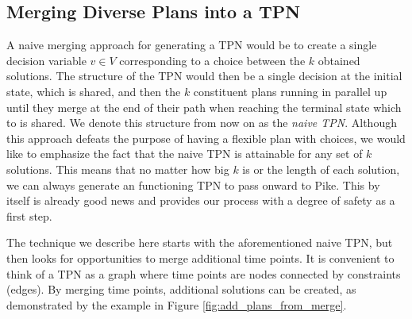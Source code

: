 \subsection{Merging Diverse Plans into a TPN}
\label{generating: merging}
A naive merging approach for generating a TPN would be to create a single decision variable $v \in V$ corresponding to a choice 
between the $k$ obtained solutions. 
The structure of the TPN would then be a single decision at the
initial state, which is shared, and then the $k$ constituent plans running in parallel
up until they merge at the end of their path when reaching the terminal state which to is shared.
We denote this structure from now on as the \textit{naive TPN}. 
Although this approach defeats the purpose of having a flexible plan with choices, we would like to emphasize 
the fact that the naive TPN is attainable for any set of $k$ solutions. This means that no matter how big $k$ is 
or the length of each solution, we can always generate an functioning TPN to pass onward to Pike.
This by itself is already good news and provides our process with a degree of safety as a first step. 
    
The technique we describe here starts with the aforementioned naive TPN, but then looks for opportunities to merge additional time points.
It is convenient to think of a TPN as a graph where time points are nodes connected by constraints (edges).
By merging time points, additional solutions can be created, as demonstrated by the example in Figure \ref{fig:add_plans_from_merge}.


